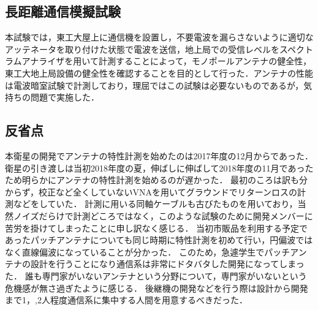 \subsection{長距離通信模擬試験}
本試験では，東工大屋上に通信機を設置し，不要電波を漏らさないように適切なアッテネータを取り付けた状態で電波を送信，地上局での受信レベルをスペクトラムアナライザを用いて計測することによって，モノポールアンテナの健全性，東工大地上局設備の健全性を確認することを目的として行った．アンテナの性能は電波暗室試験で計測しており，理屈ではこの試験は必要ないものであるが，気持ちの問題で実施した．

\subsection{反省点}
本衛星の開発でアンテナの特性計測を始めたのは2017年度の12月からであった．
衛星の引き渡しは当初2018年度の夏，伸ばしに伸ばして2018年度の11月であったため明らかにアンテナの特性計測を始めるのが遅かった．
最初のころは訳も分からず，校正など全くしていないVNAを用いてグラウンドでリターンロスの計測などをしていた．
計測に用いる同軸ケーブルも古びたものを用いており，当然ノイズだらけで計測どころではなく，このような試験のために開発メンバーに苦労を掛けてしまったことに申し訳なく感じる．
当初市販品を利用する予定であったパッチアンテナについても同じ時期に特性計測を初めて行い，円偏波ではなく直線偏波になっていることが分かった．
このため，急遽学生でパッチアンテナの設計を行うことになり通信系は非常にドタバタした開発になってしまった．
誰も専門家がいないアンテナという分野について，専門家がいないという危機感が無さ過ぎたように感じる．
後継機の開発などを行う際は設計から開発まで1，,2人程度通信系に集中する人間を用意するべきだった．

